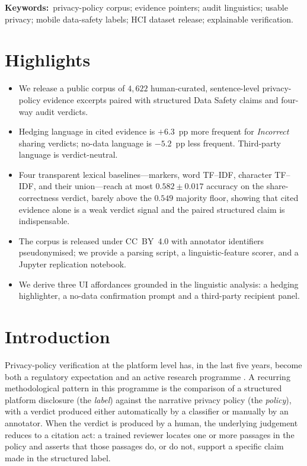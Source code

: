 \documentclass[11pt,a4paper]{article}
\begin{document}
\medskip
\noindent\textbf{Keywords:}\ privacy-policy corpus; evidence pointers;
audit linguistics; usable privacy; mobile data-safety labels; HCI
dataset release; explainable verification.

\section*{Highlights}
\begin{itemize}[leftmargin=*,itemsep=2pt,topsep=2pt]
\item We release a public corpus of $4{,}622$ human-curated,
sentence-level privacy-policy evidence excerpts paired with structured
Data Safety claims and four-way audit verdicts.
\item Hedging language in cited evidence is $+6.3$~pp more frequent for
\emph{Incorrect} sharing verdicts; no-data language is $-5.2$~pp less
frequent. Third-party language is verdict-neutral.
\item Four transparent lexical baselines---markers, word TF--IDF,
character TF--IDF, and their union---reach at most
$0.582\pm0.017$ accuracy on the share-correctness verdict, barely
above the $0.549$ majority floor, showing that cited evidence alone
is a weak verdict signal and the paired structured claim is
indispensable.
\item The corpus is released under CC~BY~4.0 with annotator
identifiers pseudonymised; we provide a parsing script, a
linguistic-feature scorer, and a Jupyter replication notebook.
\item We derive three UI affordances grounded in the linguistic
analysis: a hedging highlighter, a no-data confirmation prompt and a
third-party recipient panel.
\end{itemize}

\section{Introduction}\label{sec:intro}
Privacy-policy verification at the platform level has, in the last
five years, become both a regulatory expectation
\citep{googledatasafety2022,appleprivacylabels2020} and an active
research programme
\citep{andow2019policylint,andow2020policheck,zimmeck2019maps,
xiao2023lalaine,khandelwal2024unpacking,khandelwal2023comparing}. A
recurring methodological pattern in this programme is the comparison
of a structured platform disclosure (the \emph{label}) against the
narrative privacy policy (the \emph{policy}), with a verdict produced
either automatically by a classifier or manually by an annotator. When
the verdict is produced by a human, the underlying judgement reduces
to a citation act: a trained reviewer locates one or more passages in
the policy and asserts that those passages do, or do not, support a
specific claim made in the structured label.
\end{document}
